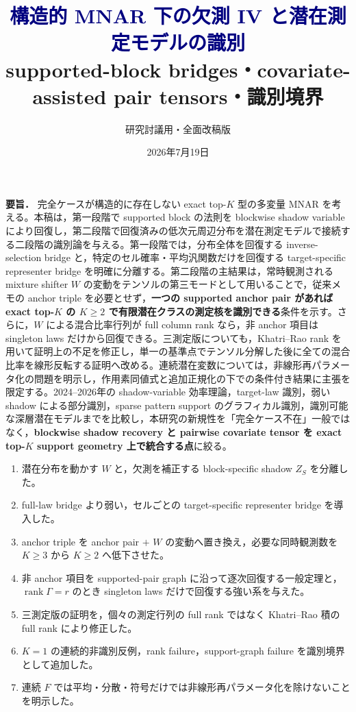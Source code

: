 \documentclass[11pt,a4paper]{ltjsarticle}
\title{\vspace{-1.7cm}\textcolor{navy}{\bfseries 構造的 MNAR 下の欠測 IV と潜在測定モデルの識別}\\[2mm]
\large supported-block bridges・covariate-assisted pair tensors・識別境界}
\author{研究討議用・全面改稿版}
\date{2026年7月19日}
\theoremstyle{remark}\newtheorem{remark}{注意}[section]
\newcommand{\rank}{\operatorname{rank}}
\begin{document}
\maketitle

\begin{tcolorbox}[colback=soft,colframe=accent,boxrule=.8pt,arc=2mm]
\textbf{要旨．}
完全ケースが構造的に存在しない exact top-$K$ 型の多変量 MNAR を考える。本稿は，第一段階で supported block の法則を blockwise shadow variable により回復し，第二段階で回復済みの低次元周辺分布を潜在測定モデルで接続する二段階の識別論を与える。第一段階では，分布全体を回復する inverse-selection bridge と，特定のセル確率・平均汎関数だけを回復する target-specific representer bridge を明確に分離する。第二段階の主結果は，常時観測される mixture shifter $W$ の変動をテンソルの第三モードとして用いることで，従来メモの anchor triple を必要とせず，\textbf{一つの supported anchor pair があれば exact top-$K$ の $K\ge2$ で有限潜在クラスの測定核を識別できる}条件を示す。さらに，$W$ による混合比率行列が full column rank なら，非 anchor 項目は singleton laws だけから回復できる。三測定版についても，Khatri--Rao rank を用いて証明上の不足を修正し，単一の基準点でテンソル分解した後に全ての混合比率を線形反転する証明へ改める。連続潜在変数については，非線形再パラメータ化の問題を明示し，作用素同値式と追加正規化の下での条件付き結果に主張を限定する。2024--2026年の shadow-variable 効率理論，target-law 識別，弱い shadow による部分識別，sparse pattern support のグラフィカル識別，識別可能な深層潜在モデルまでを比較し，本研究の新規性を「完全ケース不在」一般ではなく，\textbf{blockwise shadow recovery と pairwise covariate tensor を exact top-$K$ support geometry 上で統合する点}に絞る。
\end{tcolorbox}

\begin{tcolorbox}[colback=white,colframe=green,boxrule=.7pt,arc=2mm,title=今回の主要な改稿点]
\begin{enumerate}[label=\textbf{R\arabic*.}]
\item 潜在分布を動かす $W$ と，欠測を補正する block-specific shadow $Z_S$ を分離した。
\item full-law bridge より弱い，セルごとの target-specific representer bridge を導入した。
\item anchor triple を anchor pair $+$ $W$ の変動へ置き換え，必要な同時観測数を $K\ge3$ から $K\ge2$ へ低下させた。
\item 非 anchor 項目を supported-pair graph に沿って逐次回復する一般定理と，$\rank\Gamma=r$ のとき singleton laws だけで回復する強い系を与えた。
\item 三測定版の証明を，個々の測定行列の full rank ではなく Khatri--Rao 積の full rank により修正した。
\item $K=1$ の連続的非識別反例，rank failure，support-graph failure を識別境界として追加した。
\item 連続 $F$ では平均・分散・符号だけでは非線形再パラメータ化を除けないことを明示した。
\end{enumerate}
\end{tcolorbox}
\end{document}
